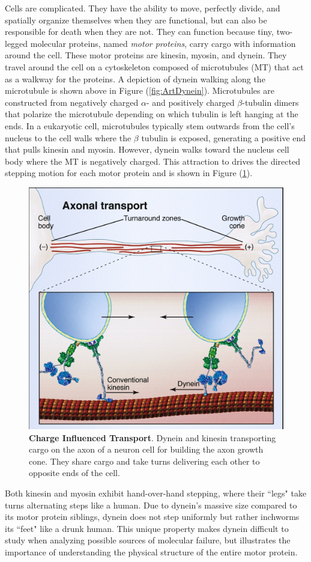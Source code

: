 Cells are complicated. They have the ability to move, perfectly divide, and spatially organize themselves when they are functional, but can also be responsible for death when they are not. They can function because tiny, two-legged molecular proteins, named \textit{motor proteins}, carry cargo with information around the cell. These motor proteins are kinesin, myosin, and dynein. They travel around the cell on a cytoskeleton composed of microtubules (MT) that act as a walkway for the proteins. A depiction of dynein walking along the microtubule is shown above in Figure (\ref{fig:ArtDynein}). Microtubules are constructed from negatively charged $\alpha$- and positively charged $\beta$-tubulin dimers that polarize the microtubule depending on which tubulin is left hanging at the ends. In a eukaryotic cell, microtubules typically stem outwards from the cell's nucleus to the cell walls where the $\beta$ tubulin is exposed, generating a positive end that pulls kinesin and myosin. However, dynein walks toward the nucleus cell body where the MT is negatively charged. This attraction to drives the directed stepping motion for each motor protein and is shown in Figure (\ref{fig:transport}). 

\begin{figure}[H]
	\centering
	\includegraphics[width=0.6\columnwidth]{Figures/retrograde_transport.jpg}
	\caption[Charge Influenced Transport]{\textbf{Charge Influenced Transport}. Dynein and kinesin transporting cargo on the axon of a neuron cell for building the axon growth cone. They share cargo and take turns delivering each other to opposite ends of the cell. \cite{Vale2003molecular}}
	\label{fig:transport}
\end{figure}

Both kinesin and myosin exhibit hand-over-hand stepping, where their ``legs" take turns alternating steps like a human. Due to dynein's massive size compared to its motor protein siblings, dynein does not step uniformly but rather inchworms its ``feet" like a drunk human. This unique property makes dynein difficult to study when analyzing possible sources of molecular failure, but illustrates the importance of understanding the physical structure of the entire motor protein.


